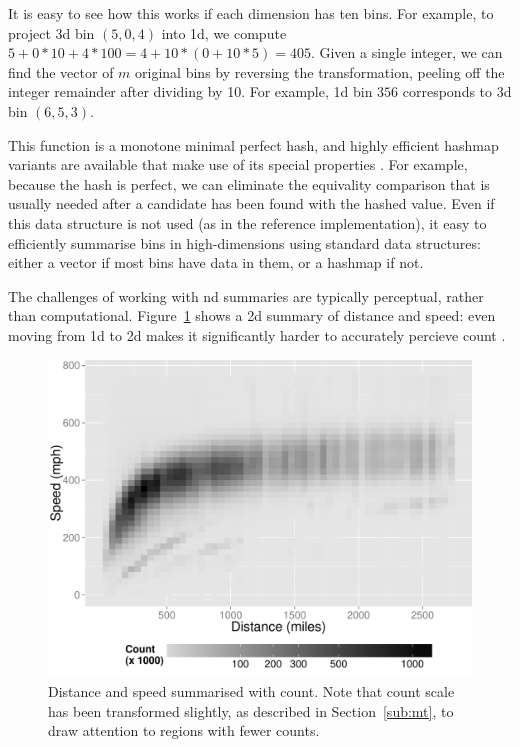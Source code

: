 \documentclass[journal]{vgtc}                %
\begin{document}
It is easy to see how this works if each dimension has ten bins. For example, to project 3d bin $(5, 0, 4)$ into 1d, we compute $5 + 0 * 10 + 4 * 100 = 4 + 10 * (0 + 10 * 5) = 405$. Given a single integer, we can find the vector of $m$ original bins by reversing the transformation, peeling off the integer remainder after dividing by 10. For example, 1d bin $356$ corresponds to 3d bin $(6, 5, 3)$.

This function is a monotone minimal perfect hash, and highly efficient hashmap variants are available that make use of its special properties \citep{belazzougui:2009}. For example, because the hash is perfect, we can eliminate the equivality comparison that is usually needed after a candidate has been found with the hashed value. Even if this data structure is not used (as in the reference implementation), it easy to efficiently summarise bins in high-dimensions using standard data structures: either a vector if most bins have data in them, or a hashmap if not.

The challenges of working with nd summaries are typically perceptual, rather than computational. Figure~\ref{fig:condense-2d} shows a 2d summary of distance and speed: even moving from 1d to 2d makes it significantly harder to accurately percieve count \citep{cleveland:1984}.

\begin{figure}[htb]
 \centering
 \includegraphics[width=\linewidth]{condense-2d}
 \caption{Distance and speed summarised with count. Note that count scale has been transformed slightly, as described in Section~\ref{sub:mt}, to draw attention to regions with fewer counts.}
 \label{fig:condense-2d}
\end{figure}
\end{document}
